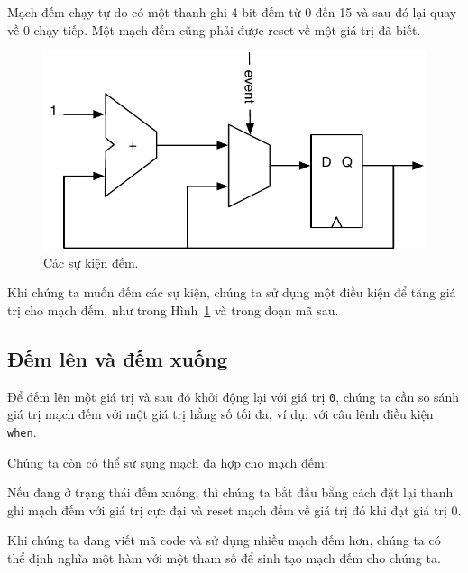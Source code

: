 \documentclass[%
    10pt,
    headinclude, footexclude,
    openright, %
    notitlepage,
    cleardoubleempty,
    headsepline,
    pointlessnumbers,
    bibtotoc, idxtotoc,
    ]{scrbook}
\newcommand{\code}[1]{{\small{\texttt{#1}}}}
\newcommand{\scale}{0.7}
\begin{document}
Mạch đếm chạy tự do có một thanh ghi 4-bit đếm từ 0 đến 15 và sau đó lại quay về 0 chạy tiếp. 
Một mạch đếm cũng phải được reset về một giá trị đã biết.


\begin{figure}
  \centering
  \includegraphics[scale=\scale]{figures/event-counter}
  \caption{Các sự kiện đếm.}
  \label{fig:event-counter}
\end{figure}

\noindent Khi chúng ta muốn đếm các sự kiện, chúng ta sử dụng một điều kiện để tăng giá trị cho mạch đếm, 
như trong Hình~\ref{fig:event-counter} và trong đoạn mã sau.


\subsection{Đếm lên và đếm xuống}

Để đếm lên một giá trị và sau đó khởi động lại với giá trị \code{0}, chúng ta cần so sánh 
giá trị mạch đếm với một giá trị hằng số tối đa, ví dụ: với câu lệnh điều kiện \code{when}.


\noindent Chúng ta còn có thể sử sụng mạch đa hợp cho mạch đếm:


\noindent Nếu đang ở trạng thái đếm xuống, thì chúng ta bắt đầu bằng cách đặt lại thanh ghi mạch đếm với giá trị cực đại và reset mạch đếm về giá trị đó khi đạt giá trị 0.


\noindent Khi chúng ta đang viết mã code và sử dụng nhiều mạch đếm hơn, chúng ta có thể định nghĩa một hàm với một tham số để sinh tạo mạch đếm cho chúng ta. 
\end{document}
